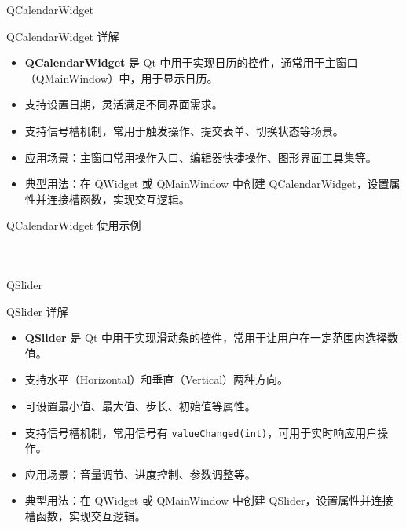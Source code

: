 \documentclass[UTF8,aspectratio=169]{beamer}
\begin{document}
\begin{frame}{QCalendarWidget}
    \begin{ytublock}{QCalendarWidget 详解}
        \begin{itemize}
            \item \textbf{QCalendarWidget} 是 Qt 中用于实现日历的控件，通常用于主窗口（QMainWindow）中，用于显示日历。
            \item 支持设置日期，灵活满足不同界面需求。
            \item 支持信号槽机制，常用于触发操作、提交表单、切换状态等场景。
            \item 应用场景：主窗口常用操作入口、编辑器快捷操作、图形界面工具集等。
            \item 典型用法：在 QWidget 或 QMainWindow 中创建 QCalendarWidget，设置属性并连接槽函数，实现交互逻辑。
        \end{itemize}
    \end{ytublock}
\end{frame}

\begin{frame}[fragile]{QCalendarWidget 使用示例}
    \begin{columns}
        \begin{column}{0.48\textwidth}
            \inputminted[firstline=1,lastline=18]{cpp}{code/qt_calendarwidget_example.cpp}
        \end{column}
        \begin{column}{0.48\textwidth}
            \inputminted[firstline=19,lastline=36]{cpp}{code/qt_calendarwidget_example.cpp}
        \end{column}
    \end{columns}
\end{frame}

\begin{frame}{QSlider}
    \begin{ytublock}{QSlider 详解}
        \begin{itemize}
            \item \textbf{QSlider} 是 Qt 中用于实现滑动条的控件，常用于让用户在一定范围内选择数值。
            \item 支持水平（Horizontal）和垂直（Vertical）两种方向。
            \item 可设置最小值、最大值、步长、初始值等属性。
            \item 支持信号槽机制，常用信号有 \texttt{valueChanged(int)}，可用于实时响应用户操作。
            \item 应用场景：音量调节、进度控制、参数调整等。
            \item 典型用法：在 QWidget 或 QMainWindow 中创建 QSlider，设置属性并连接槽函数，实现交互逻辑。
        \end{itemize}
    \end{ytublock}
\end{frame}
\end{document}
